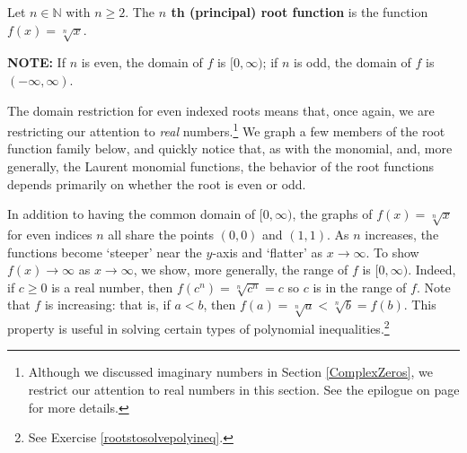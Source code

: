 \documentclass{ximera}
\begin{document}
\smallskip

\colorbox{ResultColor}{\bbm

\begin{defn} \label{principalrootfunction}  Let $n \in \mathbb{N}$ with $n \geq 2$.  The  \textbf{$n$ th (principal) root function} is the function $f(x) = \sqrt[n]{x}$.  

\textbf{NOTE:}  If $n$ is even, the domain of $f$ is $[0, \infty)$;  if $n$ is odd, the domain of $f$ is $(-\infty, \infty)$.

\end{defn}

\ebm}

\smallskip

The domain restriction for even indexed roots means that, once again, we are restricting our attention to \textit{real} numbers.\footnote{Although we discussed imaginary numbers in Section \ref{ComplexZeros}, we restrict our attention to real numbers in this section.  See the epilogue on page \pageref{complexepilogue} for more details.}  We graph a few members of the root function family below, and quickly notice that, as with the monomial, and, more generally, the Laurent monomial functions, the behavior of the root functions depends primarily on whether the root is even or odd.  

In addition to having the common domain of $[0, \infty)$, the graphs of $f(x) = \sqrt[n]{x}$ for even indices $n$ all share the points $(0,0)$ and $(1,1)$. As $n$ increases, the functions become `steeper' near the $y$-axis and `flatter' as $x \rightarrow \infty$.  To show $f(x) \rightarrow \infty$ as $x \rightarrow \infty$, we show, more generally, the range of $f$ is $[0, \infty)$.  Indeed, if $c \geq 0$ is a real number, then $f(c^n) = \sqrt[n]{c^n} = c$ so $c$ is in the range of $f$.  Note that $f$ is increasing:  that is, if $a<b$, then $f(a) = \sqrt[n]{a} < \sqrt[n]{b} = f(b)$. This property is useful in solving certain types of polynomial inequalities.\footnote{See Exercise \ref{rootstosolvepolyineq}.}
\end{document}
